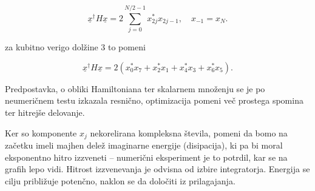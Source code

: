 \documentclass[a4 paper, 12pt]{article}
\begin{document}
\begin{equation}
	\underline{x}^\dagger H \underline{x} = 2\sum_{j = 0}^{N/2 - 1} x^*_{2j}x_{2j-1}, \quad x_{-1} = x_N.
\end{equation}

za kubitno verigo dolžine 3 to pomeni

\[
	\underline{x}^\dagger H \underline{x} = 2 (x_0^* x_7 + x_2^* x_1 + x_4^*x_3 + x_6^*x_5).
\]

Predpostavka, o obliki Hamiltoniana ter skalarnem množenju se je po neumeričnem testu izkazala resnično, optimizacija
pomeni več prostega spomina ter hitrejše delovanje.

Ker so komponente $x_j$ nekorelirana kompleksna števila, pomeni da bomo na začetku imeli majhen delež imaginarne
energije (disipacija), ki pa bi moral eksponentno hitro izzveneti -- numerični eksperiment je to potrdil, kar se na
grafih lepo vidi.
Hitrost izzvenevanja je odvisna od izbire integratorja.
Energija se cilju približuje potenčno, naklon se da določiti iz prilagajanja.
\end{document}
